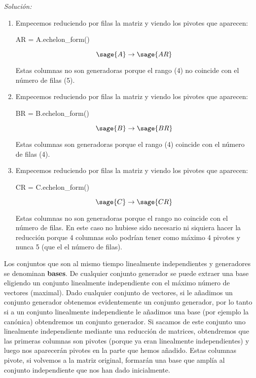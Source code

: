 \documentclass{amsart}
\begin{document}
{\it Solución:}
\begin{enumerate}
\item Empecemos reduciendo por filas la matriz y viendo los pivotes que 
aparecen:

\begin{sageblock}
AR = A.echelon_form()
\end{sageblock}

$$ \sage{A} \to \sage{AR} $$

Estas columnas no son generadoras porque el rango (4) no coincide con el
número de filas (5).

\item Empecemos reduciendo por filas la matriz y viendo los pivotes que 
aparecen:

\begin{sageblock}
BR = B.echelon_form()
\end{sageblock}

$$ \sage{B} \to \sage{BR} $$

Estas columnas son generadoras porque el rango (4) coincide con el número
de filas (4).

\item Empecemos reduciendo por filas la matriz y viendo los pivotes que 
aparecen:

\begin{sageblock}
CR = C.echelon_form()
\end{sageblock}

$$ \sage{C} \to \sage{CR} $$

Estas columnas no son generadoras porque el rango no coincide con el número
de filas. En este caso no hubiese sido necesario ni siquiera hacer la 
reducción porque 4 columnas solo podrían tener como máximo 4 pivotes y 
nunca 5 (que el el número de filas).

\end{enumerate}

Los conjuntos que son al mismo tiempo linealmente independientes y generadores
se denominan {\bf bases}. De cualquier conjunto generador se puede extraer 
una base eligiendo un conjunto linealmente independiente con el máximo 
número de vectores (maximal). Dado cualquier conjunto de 
vectores, si le añadimos
un conjunto generador obtenemos evidentemente un conjunto generador, por lo 
tanto si a un conjunto linealmente independiente le añadimos una base (por 
ejemplo la canónica) obtendremos un conjunto generador. Si sacamos de este 
conjunto uno linealmente independiente mediante una reducción de matrices, 
obtendremos que 
las primeras columnas son pivotes (porque ya eran linealmente 
independientes) y luego nos aparecerán pivotes en la parte
que hemos añadido. Estas columnas pivote, si volvemos a la matriz original, 
formarán una base que amplía al conjunto independiente que nos han dado 
inicialmente. 
\end{document}
